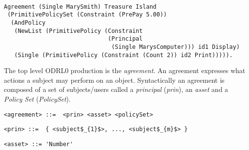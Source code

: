 \lstset{language=Coq}
\begin{lstlisting}[frame=single, caption={Coq version of agreement for Mary Smith},label={lst:agreementcoq}]

Agreement (Single MarySmith) Treasure Island 
 (PrimitivePolicySet (Constraint (PrePay 5.00))
  (AndPolicy 
   (NewList (PrimitivePolicy (Constraint 
                              (Principal 
                               (Single MarysComputer))) id1 Display)
   (Single (PrimitivePolicy (Constraint (Count 2)) id2 Print))))).
\end{lstlisting}



The top level ODRL0 production is the \emph{agreement}. An agreement expresses what actions a subject may perform on an object. Syntactically an agreement is composed of a set of subjects/users called a \emph{principal} (\emph{prin}), an \emph{asset} and a \emph{Policy Set} (\emph{PolicySet}).

\lstset{language=AST}
\begin{lstlisting}[frame=single, caption={agreement},label={lst:agreement}]
<agreement> ::=  <prin> <asset> <policySet> 
\end{lstlisting}



\lstset{mathescape, language=AST}  
\begin{lstlisting}[frame=single, caption={prin},label={lst:prin}]
<prin> ::=  { <subject$_{1}$>, ..., <subject$_{m}$> }
\end{lstlisting}



\lstset{mathescape, language=AST}  
\begin{lstlisting}[frame=single, caption={asset},label={lst:asset}]
<asset> ::= 'Number'
\end{lstlisting}


